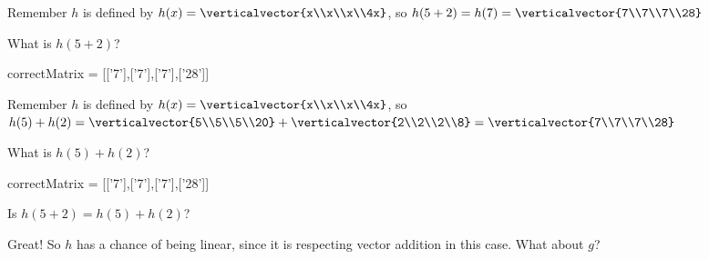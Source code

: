 \documentclass{ximera}
\begin{document}
\begin{question}
\begin{solution}
\begin{hint}
\begin{question}
        	\begin{solution}
		\begin{hint}
			Remember $h$ is defined by $h(x) = \verticalvector{x\\x\\x\\4x}$, so
			$h(5+2) = h(7)= \verticalvector{7\\7\\7\\28}$
		\end{hint}
        	 What is $h(5+2)$?
        	\begin{matrix-answer}[name=v]
    			  correctMatrix = [['7'],['7'],['7'],['28']]
        	 \end{matrix-answer}
        	\end{solution}
        	\begin{solution}
		\begin{hint}
			Remember $h$ is defined by $h(x) =\verticalvector{x\\x\\x\\4x}$, so
			$h(5)+h(2) =  \verticalvector{5\\5\\5\\20}+\verticalvector{2\\2\\2\\8} = \verticalvector{7\\7\\7\\28}$
		\end{hint}
        	 What is $h(5) + h(2)$?
        	 \begin{matrix-answer}[name=v]
    			  correctMatrix = [['7'],['7'],['7'],['28']]
        	 \end{matrix-answer}
        	\end{solution}
        	\begin{solution}
        		Is $h(5+2) = h(5)+h(2)$?
        		\begin{multiple-choice}
        		\choice[correct]{Yes}
        		\choice{No}
        		\end{multiple-choice}
        	\end{solution}
        	
        	Great!  So $h$ has a chance of being linear, since it is respecting vector addition in this case.
        	What about $g$?        	
        	

\end{question}
\end{hint}
\end{solution}
\end{question}
\end{document}

